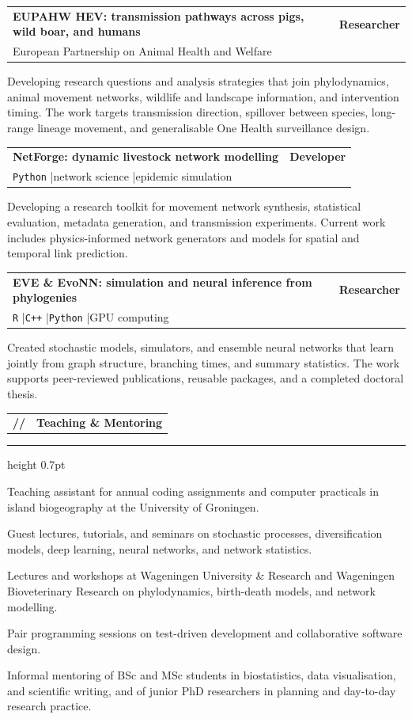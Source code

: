 \documentclass[10pt,a4paper]{article}
\makeatletter
\newcommand{\cvsection}[1]{%
  \Needspace{4\baselineskip}%
  \vspace{0.72em}%
  \noindent
  \begin{tabularx}{\textwidth}{@{}l@{\hspace{0.58em}}X@{}}
    {\color{Teal}\ttfamily\bfseries //} &
    {\large\bfseries\color{Teal} #1}
  \end{tabularx}
  \vspace{0.16em}\par
  {\color{Line}\hrule height 0.7pt}
  \vspace{0.42em}
}
\newcommand{\projectentry}[4]{%
  \Needspace{5\baselineskip}%
  \begin{tabularx}{\textwidth}{@{}X@{\hspace{0.3cm}}>{\raggedleft\arraybackslash}p{3.05cm}@{}}
    {\bfseries\color{Ink} #1} & {\small\bfseries\color{Teal} #2} \\
    {\small\color{Muted} #3} & {}
  \end{tabularx}
  \vspace{0.12em}
  #4
  \vspace{0.48em}
}
\newcommand{\tool}[1]{\texttt{\color{Navy}#1}}
\newcommand{\sep}{\enspace\textcolor{Line}{|}\enspace}
\makeatother
\begin{document}
\projectentry
  {EUPAHW HEV: transmission pathways across pigs, wild boar, and humans}
  {Researcher}
  {European Partnership on Animal Health and Welfare}
  {\begin{cvlist}
    \item Developing research questions and analysis strategies that join phylodynamics,
      animal movement networks, wildlife and landscape information, and intervention timing. The work
      targets transmission direction, spillover between species, long-range lineage movement, and
      generalisable One Health surveillance design.
  \end{cvlist}}

\projectentry
  {NetForge: dynamic livestock network modelling}
  {Developer}
  {\tool{Python} \sep network science \sep epidemic simulation}
  {\begin{cvlist}
    \item Developing a research toolkit for movement network synthesis, statistical evaluation, metadata
      generation, and transmission experiments. Current work includes physics-informed network
      generators and models for spatial and temporal link prediction.
  \end{cvlist}}

\projectentry
  {EVE \& EvoNN: simulation and neural inference from phylogenies}
  {Researcher}
  {\tool{R} \sep \tool{C++} \sep \tool{Python} \sep GPU computing}
  {\begin{cvlist}
    \item Created stochastic models, simulators, and ensemble neural networks that learn jointly from graph
      structure, branching times, and summary statistics. The work supports peer-reviewed publications,
      reusable packages, and a completed doctoral thesis.
  \end{cvlist}}

\cvsection{Teaching \& Mentoring}

\begin{cvlist}
  \item Teaching assistant for annual coding assignments and computer practicals in island
  biogeography at the University of Groningen.
  \item Guest lectures, tutorials, and seminars on stochastic processes, diversification models,
  deep learning, neural networks, and network statistics.
  \item Lectures and workshops at Wageningen University \& Research and Wageningen Bioveterinary
  Research on phylodynamics, birth-death models, and network modelling.
  \item Pair programming sessions on test-driven development and collaborative software design.
  \item Informal mentoring of BSc and MSc students in biostatistics, data visualisation, and
  scientific writing, and of junior PhD researchers in planning and day-to-day research practice.
\end{cvlist}
\end{document}
